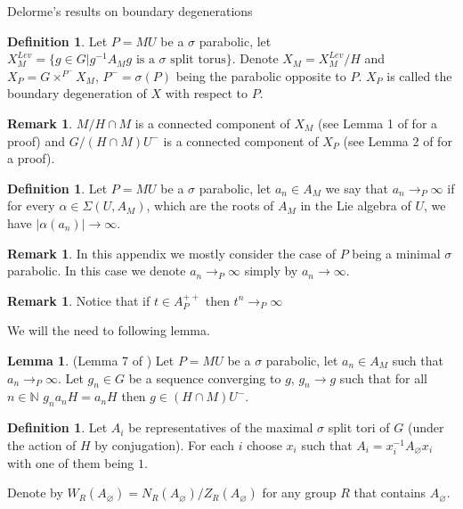 \documentclass[12pt]{article}
\newcommand{\N}{\mathbb{N}}
\newcommand{\<}{\langle}
\renewcommand{\>}{\rangle}
\renewcommand{\emptyset}{\varnothing}
\theoremstyle{plain}
\theoremstyle{definition}
\newtheorem{lemma}[theorem]{Lemma}
\newtheorem{Remark}[theorem]{Remark}
\newtheorem{defn}[theorem]{Definition}
\begin{document}
\begin{subsection}{Delorme's results on boundary degenerations}
\begin{defn}
    Let $P=MU$ be a $\sigma$ parabolic, let $X^{Lev}_M=\{g\in G| g^{-1}A_Mg \text{ is a $\sigma$ split torus}\}$. Denote $X_M=X^{Lev}_M/H$ and $X_P=G\times^{P^-} X_M$, $P^-=\sigma(P)$ being the parabolic opposite to $P$.
    $X_P$ is called the boundary degeneration of $X$ with respect to $P$.
\end{defn}

\begin{Remark}
$M/H\cap M$ is a connected component of $X_M$ (see Lemma 1 of \cite{NeighborhoodsInf} for a proof) and $G/(H\cap M)U^-$ is a connected component of $X_P$ (see Lemma 2 of \cite{NeighborhoodsInf} for a proof).
\end{Remark}

\begin{defn}
    Let $P=MU$ be a $\sigma$ parabolic, let $a_n\in A_M$ we say that $a_n\rightarrow_P \infty$ if for every $\alpha\in \Sigma(U,A_M)$, which are the roots of $A_M$ in the Lie algebra of $U$, we have $|\alpha(a_n)|\rightarrow\infty$.
\end{defn}

\begin{Remark}
    In this appendix we mostly consider the case of $P$ being a minimal $\sigma$ parabolic. In this case we denote $a_n\rightarrow_P \infty$ simply by $a_n\rightarrow\infty$.
\end{Remark}

\begin{Remark}
    Notice that if $t\in A_P^{++}$ then $t^n\rightarrow_P\infty$ 
\end{Remark}

We will the need to following lemma. 

\begin{lemma}{(Lemma 7 of \cite{NeighborhoodsInf})}
\label{lemma7}
Let $P=MU$ be a $\sigma$ parabolic, let $a_n\in A_M$ such that $a_n\rightarrow_P\infty$. Let $g_n\in G$ be a sequence converging to $g$, $g_n\rightarrow g$ such that for all $n\in\N$ $g_na_nH=a_nH$ then $g\in (H\cap M)U^-$.
\end{lemma}

\begin{defn}
    Let $A_i$ be representatives of the maximal $\sigma$ split tori of $G$ (under the action of $H$ by conjugation). For each $i$ choose $x_i$ such that $A_i=x^{-1}_i A_\emptyset x_i$ with one of them being $1$. 

    Denote by $W_R(A_\emptyset)=N_R(A_\emptyset)/Z_R(A_\emptyset)$ for any group $R$ that contains $A_\emptyset$.
    

\end{defn}
\end{subsection}
\end{document}
